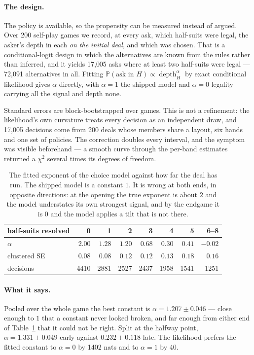 \documentclass[11pt,letterpaper]{article}
\newcommand{\Prob}{\ensuremath{\mathbb{P}}}
\begin{document}
\paragraph{The design.} The policy is available, so the propensity can be
measured instead of argued. Over 200 self-play games we record, at every ask,
which half-suits were legal, the asker's depth in each \emph{on the initial
deal}, and which was chosen. That is a conditional-logit design in which the
alternatives are known from the rules rather than inferred, and it yields 17{,}005
asks where at least two half-suits were legal --- 72{,}091 alternatives in all.
Fitting $\Prob(\text{ask in }H) \propto \operatorname{depth}_H^{\alpha}$ by exact
conditional likelihood gives $\alpha$ directly, with $\alpha = 1$ the shipped
model and $\alpha = 0$ legality carrying all the signal and depth none.

Standard errors are block-bootstrapped over games. This is not a refinement: the
likelihood's own curvature treats every decision as an independent draw, and
17{,}005 decisions come from 200 deals whose members share a layout, six hands and
one set of policies. The correction doubles every interval, and the symptom was
visible beforehand --- a smooth curve through the per-band estimates returned a
$\chi^2$ several times its degrees of freedom.

\begin{table}[t]
\centering
\small
\begin{tabular}{lrrrrrrr}
\toprule
half-suits resolved & 0 & 1 & 2 & 3 & 4 & 5 & 6--8 \\
\midrule
$\alpha$          & $2.00$ & $1.28$ & $1.20$ & $0.68$ & $0.30$ & $0.41$ & $-0.02$ \\
clustered SE      & $0.08$ & $0.08$ & $0.12$ & $0.12$ & $0.13$ & $0.18$ & $0.16$ \\
decisions         & 4410 & 2881 & 2527 & 2437 & 1958 & 1541 & 1251 \\
\bottomrule
\end{tabular}
\caption{The fitted exponent of the choice model against how far the deal has
run. The shipped model is a constant $1$. It is wrong at both ends, in opposite
directions: at the opening the true exponent is about $2$ and the model
understates its own strongest signal, and by the endgame it is $0$ and the model
applies a tilt that is not there.}
\label{tab:choicecurve}
\end{table}

\paragraph{What it says.} Pooled over the whole game the best constant is
$\alpha = 1.207 \pm 0.046$ --- close enough to $1$ that a constant never looked
broken, and far enough from either end of Table~\ref{tab:choicecurve} that it
could not be right. Split at the halfway point, $\alpha = 1.331 \pm 0.049$ early
against $0.232 \pm 0.118$ late. The likelihood prefers the fitted constant to
$\alpha = 0$ by 1402 nats and to $\alpha = 1$ by 40.
\end{document}
